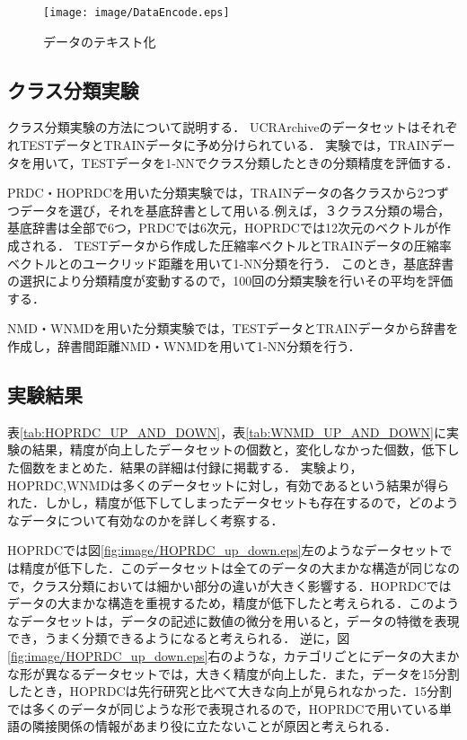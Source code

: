 \begin{figure}[tb]
\begin{center}
\texttt{[image: image/DataEncode.eps]}
\end{center}
\caption{データのテキスト化}
\label{fig:DataEncode.eps}
\end{figure}

\subsection{クラス分類実験} %
\label{sub:クラス分類実験}
クラス分類実験の方法について説明する．
UCRArchiveのデータセットはそれぞれTESTデータとTRAINデータに予め分けられている．
実験では，TRAINデータを用いて，TESTデータを1-NNでクラス分類したときの分類精度を評価する．

PRDC・HOPRDCを用いた分類実験では，TRAINデータの各クラスから2つずつデータを選び，それを基底辞書として用いる.例えば，３クラス分類の場合，基底辞書は全部で6つ，PRDCでは6次元，HOPRDCでは12次元のベクトルが作成される．
TESTデータから作成した圧縮率ベクトルとTRAINデータの圧縮率ベクトルとのユークリッド距離を用いて1-NN分類を行う．
このとき，基底辞書の選択により分類精度が変動するので，100回の分類実験を行いその平均を評価する．

NMD・WNMDを用いた分類実験では，TESTデータとTRAINデータから辞書を作成し，辞書間距離NMD・WNMDを用いて1-NN分類を行う．
\subsection{実験結果} %
\label{sub:実験結果}
表\ref{tab:HOPRDC_UP_AND_DOWN}，表\ref{tab:WNMD_UP_AND_DOWN}に実験の結果，精度が向上したデータセットの個数と，変化しなかった個数，低下した個数をまとめた．結果の詳細は付録に掲載する．
実験より，HOPRDC,WNMDは多くのデータセットに対し，有効であるという結果が得られた．しかし，精度が低下してしまったデータセットも存在するので，どのようなデータについて有効なのかを詳しく考察する．

HOPRDCでは図\ref{fig:image/HOPRDC_up_down.eps}左のようなデータセットでは精度が低下した．このデータセットは全てのデータの大まかな構造が同じなので，クラス分類においては細かい部分の違いが大きく影響する．HOPRDCではデータの大まかな構造を重視するため，精度が低下したと考えられる．このようなデータセットは，データの記述に数値の微分を用いると，データの特徴を表現でき，うまく分類できるようになると考えられる．
逆に，図\ref{fig:image/HOPRDC_up_down.eps}右のような，カテゴリごとにデータの大まかな形が異なるデータセットでは，大きく精度が向上した．また，データを15分割したとき，HOPRDCは先行研究と比べて大きな向上が見られなかった．15分割では多くのデータが同じような形で表現されるので，HOPRDCで用いている単語の隣接関係の情報があまり役に立たないことが原因と考えられる．

